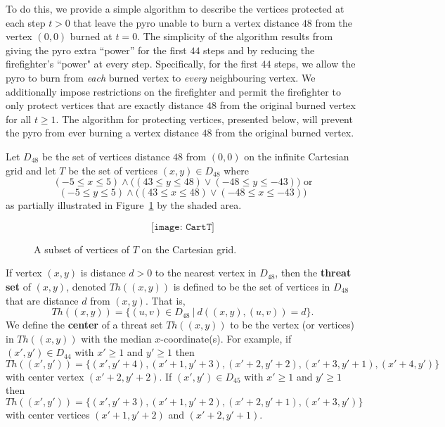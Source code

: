 \documentclass[12pt]{article}
\begin{document}
To do this, we provide a simple algorithm to describe the vertices protected at each step $t>0$ that leave the pyro unable to burn a vertex distance $48$ from the vertex $(0,0)$ burned at $t=0$.  The simplicity of the algorithm results from giving the pyro extra ``power'' for the first $44$ steps and by reducing the firefighter's ``power" at every step.  Specifically, for the first $44$ steps, we allow the pyro to burn from {\it each} burned vertex to {\it every} neighbouring vertex.  We additionally impose restrictions on the firefighter and permit the firefighter to only protect vertices that are exactly distance $48$ from the original burned vertex for all $t \geq 1$. The algorithm for protecting vertices, presented below, will prevent the pyro from ever burning a vertex distance $48$ from the original burned vertex.

Let $D_{48}$ be the set of vertices distance $48$ from $(0,0)$ on the infinite Cartesian grid and let $T$ be the set of vertices $(x,y) \in D_{48}$ where $$(-5 \leq x \leq 5) \wedge \Big((43 \leq y \leq 48) \vee (-48 \leq y \leq -43)\Big) \text{~or}$$ $$(-5 \leq y \leq 5) \wedge \Big((43 \leq x \leq 48) \vee (-48 \leq x \leq -43)\Big)$$ as partially illustrated in Figure~\ref{fig:CartT} by the shaded area.

\begin{figure}[htbp]

\[ \texttt{[image: CartT]} \] 

\label{fig:CartT}

\caption{A subset of vertices of $T$ on the Cartesian grid.}

\end{figure}

If vertex $(x,y)$ is distance $d > 0$ to the nearest vertex in $D_{48}$, then the {\bf threat set} of $(x,y)$, denoted $Th((x,y))$ is defined to be the set of vertices in $D_{48}$ that are distance $d$ from $(x,y)$.  That is, $$Th((x,y)) = \{ (u,v) \in D_{48} ~|~ d((x,y),(u,v))=d\}.$$  We define the {\bf center} of a threat set $Th((x,y))$ to be the vertex (or vertices) in $Th((x,y))$ with the median $x$-coordinate(s).  For example, if $(x',y') \in D_{44}$ with $x' \geq 1$ and $y' \geq 1$ then $$Th((x',y')) = \{(x',y'+4),(x'+1,y'+3),(x'+2,y'+2),(x'+3,y'+1),(x'+4,y')\}$$ with center vertex $(x'+2,y'+2)$.  If $(x',y') \in D_{45}$ with $x' \geq 1$ and $y' \geq 1$ then $$Th((x',y')) = \{(x',y'+3),(x'+1,y'+2),(x'+2,y'+1),(x'+3,y')\}$$ with center vertices $(x'+1,y'+2)$ and $(x'+2,y'+1)$. 
\end{document}
